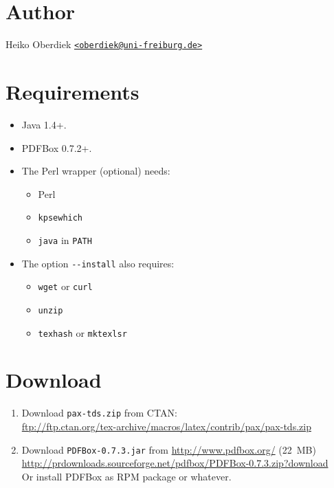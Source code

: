 \documentclass[pagesize=auto, parskip=half, fontsize=12pt, DIV=13]{scrartcl}
\newcommand*{\bmail}[1]{\href{mailto:#1}{\texttt{<#1>}}}
\newcommand*{\opt}[1]{\texttt{#1}}
\begin{document}
\section{Author}

Heiko Oberdiek \bmail{oberdiek@uni-freiburg.de}


\section{Requirements}

\begin{itemize}
\item Java 1.4+.
\item PDFBox 0.7.2+.

\item The Perl wrapper (optional) needs:
  \begin{itemize}
  \item Perl
  \item \texttt{kpsewhich}
  \item \texttt{java} in \texttt{PATH}
  \end{itemize}

\item The option \opt{-{}-install} also requires:
  \begin{itemize}
  \item \texttt{wget} or \texttt{curl}
  \item \texttt{unzip}
  \item \texttt{texhash} or \texttt{mktexlsr}
  \end{itemize}
\end{itemize}


\section{Download}

\renewcommand*{\labelenumi}{\arabic{enumi}.}
\renewcommand*{\labelenumii}{\alph{enumii})}
\renewcommand*{\theenumi}{\labelenumi}
\renewcommand*{\theenumii}{\labelenumii}

\begin{enumerate}
\item \label{item:1}
  Download \texttt{pax-tds.zip} from CTAN: \\
  \url{ftp://ftp.ctan.org/tex-archive/macros/latex/contrib/pax/pax-tds.zip}

\item \label{item:2}
  Download \texttt{PDFBox-0.7.3.jar} from \url{http://www.pdfbox.org/} (22~MB) \\
  \url{http://prdownloads.sourceforge.net/pdfbox/PDFBox-0.7.3.zip?download} \\
  Or install PDFBox as RPM package or whatever.
\end{enumerate}
\end{document}
